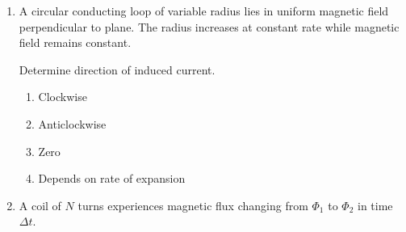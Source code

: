 \documentclass[12pt]{article}
\begin{document}
\begin{enumerate}
\begin{center}
\end{center}

\begin{enumerate}[label=\Alph*)]
\item $\dfrac{1}{2}B\omega l^2$
\item $B\omega l^2$
\item $Bl\omega$
\item Zero
\end{enumerate}

\item A circular conducting loop of variable radius lies in uniform magnetic field perpendicular to plane. The radius increases at constant rate while magnetic field remains constant.

Determine direction of induced current.

\begin{center}
\end{center}

\begin{enumerate}[label=\Alph*)]
\item Clockwise
\item Anticlockwise
\item Zero
\item Depends on rate of expansion
\end{enumerate}

\item A coil of $N$ turns experiences magnetic flux changing from $\Phi_1$ to $\Phi_2$ in time $\Delta t$.


\end{enumerate}
\end{document}
